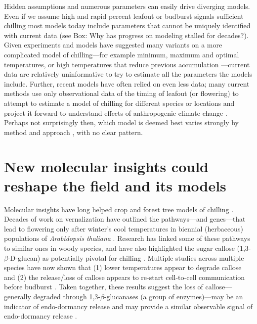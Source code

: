\documentclass[11pt]{article}
\begin{document}
Hidden assumptions and numerous parameters can easily drive diverging models. Even if we assume high and rapid percent leafout or budburst signals sufficient chilling most models today include parameters that cannot be uniquely identified with current data (see Box: Why has progress on modeling stalled for decades?).  Given experiments and models have suggested many variants on a more complicated model of chilling---for example minimum, maximum and optimal temperatures, or high temperatures that reduce previous accumulation \citep[Fig. \ref{fig:modelsketch},][]{lued2011,luedeling2012chilling,chuine2016}---current data are relatively uninformative to try to estimate all the parameters the models include. Further, recent models have often relied on even less data; many current methods use only observational data of the timing of leafout (or flowering) to attempt to estimate a model of chilling for different species or locations and project it forward to understand effects of anthropogenic climate change \citep{lued2011,luedeling2012chilling,gao2024}. Perhaps not surprisingly then, which model is deemed best varies strongly by method and approach \citep{Caffarra:2011qf,basler2016evaluating,hufkens2018integrated}, with no clear pattern. 

\section*{New molecular insights could reshape the field and its models} 

Molecular insights have long helped crop and forest tree models of chilling \citep{chuinearees}. Decades of work on vernalization have outlined the pathways---and genes---that lead to flowering only after winter's cool temperatures in biennial (herbaceous) populations of \emph{Arabidopsis thaliana} \citep[Fig. \ref{fig:molecular},][]{Wilczek:2009oa,kim2009vernalization}. Research has linked some of these pathways to similar ones in woody species, and have also highlighted the sugar callose (1,3-$\beta$-{\sc D}-glucan) as potentially pivotal for chilling \citep{vanderschoot2014,pan2021aba}. Multiple studies across multiple species have now shown that (1) lower temperatures appear to degrade callose and (2) the release/loss of callose appears to re-start cell-to-cell communication before budburst \citep{vanderschoot2014}. Taken together, these results suggest the loss of callose---generally degraded through 1,3-$\beta$-glucanases (a group of enzymes)---may be an indicator of endo-dormancy release \citep[though other factors, such as  ABA, also often change at the same time,][]{tylewicz2018photoperiodic,pan2021aba} and may provide a similar observable signal of endo-dormancy release \citep{rinne2018,andre2022populus}. 
\end{document}
